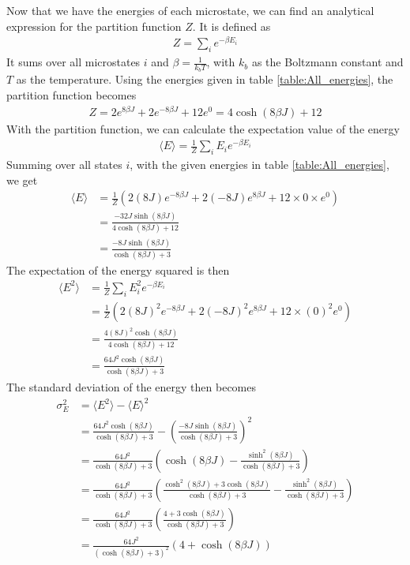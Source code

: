 \documentclass[12pt]{article}
\begin{document}
Now that we have the energies of each microstate, we can find an analytical expression for the partition function $Z$. It is defined as
\begin{align*}
Z = \displaystyle \sum_i e^{-\beta E_i}
\end{align*}
It sums over all microstates $i$ and $\beta = \frac{1}{k_bT}$, with $k_b$ as the Boltzmann constant and $T$ as the temperature. Using the energies given in table \ref{table:All_energies}, the partition function becomes
\begin{align*}
Z = 2e^{8\beta J} + 2e^{-8\beta J} + 12 e^0 = 4\cosh(8\beta J) + 12
\end{align*}
With the partition function, we can calculate the expectation value of the energy
\begin{align*}
\langle E\rangle = \frac{1}{Z}\displaystyle \sum_i E_ie^{-\beta E_i}
\end{align*}
Summing over all states $i$, with the given energies in table \ref{table:All_energies}, we get
\begin{align*}
\langle E \rangle &= \frac{1}{Z}\left( 2(8J)e^{-8\beta J} + 2(-8J)e^{8\beta J} + 12\times0\times e^0 \right)\\
&= \frac{-32J \sinh(8\beta J)}{4\cosh(8\beta J) + 12}\\
&= \frac{-8J\sinh(8\beta J)}{\cosh(8\beta J) + 3}
\end{align*}
The expectation of the energy squared is then
\begin{align*}
\langle E^2\rangle &= \frac{1}{Z}\displaystyle \sum_i E_i^2 e^{-\beta E_i} \\
&= \frac{1}{Z} \left(2(8J)^2 e^{-8\beta J} + 2(-8J)^2 e^{8\beta J} + 12 \times (0)^2 e^0 \right) \\
&= \frac{4(8J)^2\cosh(8\beta J)}{4\cosh(8\beta J) + 12} \\
&= \frac{64J^2\cosh(8\beta J)}{\cosh(8\beta J) + 3}
\end{align*}
The standard deviation of the energy then becomes
\begin{align*}
\sigma_E^2 &= \langle E^2\rangle - \langle E \rangle^2 \\
&=\frac{64J^2\cosh(8\beta J)}{\cosh(8\beta J) + 3} - \left( \frac{-8J\sinh(8\beta J)}{\cosh(8\beta J) + 3}\right)^2 \\
&= \frac{64J^2}{\cosh(8\beta J) + 3}\left(\cosh(8\beta J) - \frac{\sinh^2(8\beta J)}{\cosh(8\beta J) + 3} \right) \\
&= \frac{64J^2}{\cosh(8\beta J) + 3}\left(\frac{\cosh^2(8\beta J) + 3\cosh(8\beta J)}{\cosh(8\beta J) + 3} - \frac{\sinh^2(8\beta J)}{\cosh(8\beta J) + 3} \right) \\
&= \frac{64J^2}{\cosh(8\beta J) + 3}\left(\frac{4 + 3\cosh(8\beta J)}{\cosh(8\beta J) + 3} \right)\\
&= \frac{64J^2}{(\cosh(8\beta J) + 3)^2}(4+\cosh(8\beta J))
\end{align*}
\end{document}
